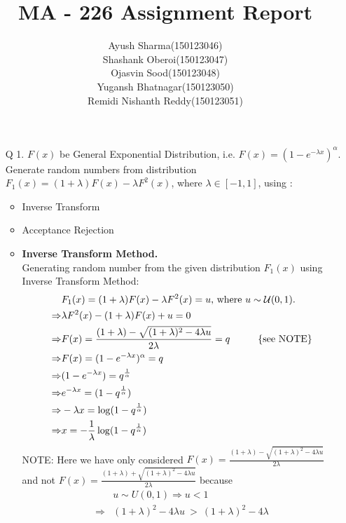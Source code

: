 \documentclass[11pt]{article}
\title{MA - 226 Assignment Report}
\author{
\begin{center}
	\begin{tabular}{c c}
	Ayush Sharma & (150123046)\\
	Shashank Oberoi & (150123047)\\
	Ojasvin Sood & (150123048)\\
	Yugansh Bhatnagar & (150123050)\\
	Remidi Nishanth Reddy & (150123051)\\
	\end{tabular}
\end{center}
}
\date{}
\begin{document}
\titlepage
\newpage
\begin{enumerate}
\item[Q 1.] $F(x)$ be General Exponential Distribution, i.e. $F(x) = (1-e^{- \lambda x})^{\alpha}$.
Generate random numbers from distribution $F_{1}(x) = (1 + \lambda)F(x) - \lambda F^{2}(x)$, where $\lambda \in [-1,1]$, using :
\begin{itemize}
	\item Inverse Transform
	\item Acceptance Rejection
\end{itemize}
\begin{itemize} 
\item \textbf{Inverse Transform Method.}\\
Generating random number from the given distribution $F_{1}(x)$ using Inverse Transform Method:\\
\begin{equation}
\begin{split}
 & F_{1}(x) = (1 + \lambda)F(x) - \lambda F^{2}(x) = u \text{, where } u \sim \mathcal{U}(0,1).\\
\Rightarrow & \lambda F^{2}(x) - (1 + \lambda)F(x) + u = 0\\
\Rightarrow & F(x) = \frac{(1 + \lambda) - \sqrt{(1 + \lambda)^{2} - 4 \lambda u}}{2 \lambda} = q \hspace{10mm} \text{\{see NOTE\}}\\
\Rightarrow & F(x) = (1-e^{- \lambda x})^{\alpha} = q\\
\Rightarrow & (1-e^{- \lambda x}) = q^{\frac{1}{\alpha}}\\
\Rightarrow & e^{- \lambda x} = (1 - q^{\frac{1}{\alpha}})\\
\Rightarrow & - \lambda x = \log(1 - q^{\frac{1}{\alpha}})\\
\Rightarrow & x = - \frac{1}{\lambda} \log(1 - q^{\frac{1}{\alpha}})\\
\end{split}\nonumber
\end{equation}
NOTE: Here we have only considered $F(x) = \frac{(1 + \lambda) - \sqrt{(1 + \lambda)^{2} - 4 \lambda u}}{2 \lambda}$ and not $F(x) = \frac{(1 + \lambda) + \sqrt{(1 + \lambda)^{2} - 4 \lambda u}}{2 \lambda} $ because 
\begin{equation}
\begin{split}
 &u \sim U(0,1) \Rightarrow u < 1\\
\Rightarrow & (1 + \lambda)^{2} - 4 \lambda u  ~>~ (1 + \lambda)^{2} - 4\lambda \\

\end{split}
\end{equation}
\end{itemize}
\end{enumerate}
\end{document}
